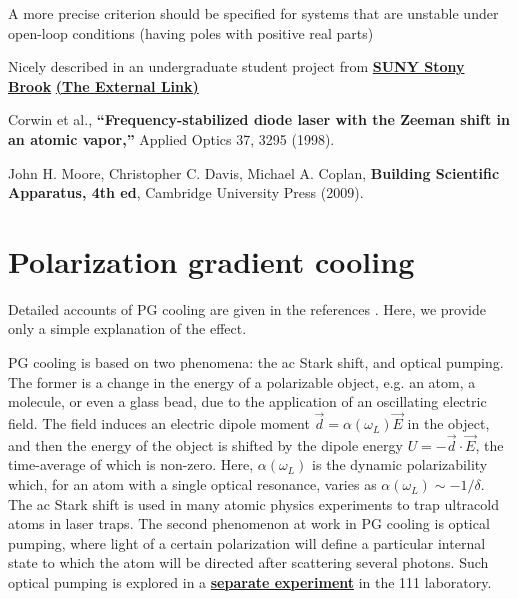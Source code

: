 \documentclass{../lab}
\begin{document}
\begin{thebibliography}{}
     A more precise criterion should be specified for systems that are unstable under open-loop conditions (having poles with positive real parts)

     Nicely described in an undergraduate student project from \href{https://berkeley-physics111b.github.io/assets/pdf/oldwebsitestructure/Mini-Project\%20Report.pdf}{\textbf{SUNY Stony Brook}} \href{http://laser.physics.sunysb.edu/~simone/mini-project/}{\textbf{(The External Link)}}

     Corwin et al., \textbf{``Frequency-stabilized diode laser with the Zeeman shift in an atomic vapor,''} Applied Optics 37, 3295 (1998).

     John H. Moore, Christopher C. Davis, Michael A. Coplan, \textbf{Building Scientific Apparatus, 4th ed}, Cambridge University Press (2009).
\end{thebibliography}

\appendix

\section{Polarization gradient cooling}
\label{sec:pgcooling}

Detailed accounts of PG cooling are given in the references \cite{Metcalf}. Here, we provide only a simple explanation of the effect.

PG cooling is based on two phenomena: the ac Stark shift, and optical pumping. The former is a change in the energy of a polarizable object, e.g. an atom, a molecule, or even a glass bead, due to the application of an oscillating electric field. The field induces an electric dipole moment $\vec{d} = \alpha(\omega_L)\vec{E}$ in the object, and then the energy of the object is shifted by the dipole energy $ U = -\vec{d}\cdot \vec{E}$, the time-average of which is non-zero. Here, $\alpha(\omega_L)$ is the dynamic polarizability which, for an atom with a single optical resonance, varies as $\alpha(\omega_L) \sim -1/\delta$. The ac Stark shift is used in many atomic physics experiments to trap ultracold atoms in laser traps. The second phenomenon at work in PG cooling is optical pumping, where light of a certain polarization will define a particular internal state to which the atom will be directed after scattering several photons. Such optical pumping is explored in a \href{https://berkeley-physics111b.github.io/assets/pdf/manuals/OPT.pdf}{\textbf{separate experiment}} in the 111 laboratory.
\end{document}

